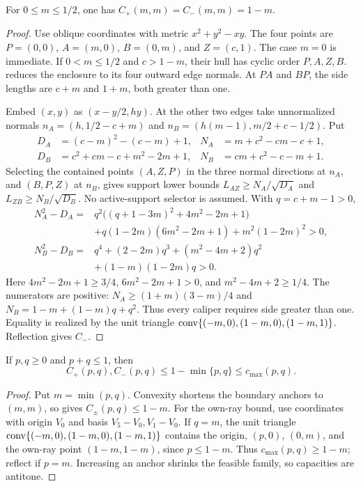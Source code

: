 \begin{lemma}
\label{lem:direct-neighbor-diagonal}
For $0\le m\le1/2$, one has $C_+(m,m)=C_-(m,m)=1-m$.
\end{lemma}
\begin{proof}
Use oblique coordinates with metric $x^2+y^2-xy$. The four points are
$P=(0,0)$, $A=(m,0)$, $B=(0,m)$, and $Z=(c,1)$. The case $m=0$
is immediate. If $0<m\le1/2$ and $c>1-m$, their hull has cyclic order
$P,A,Z,B$.  reduces the enclosure to its four outward
edge normals. At $PA$ and $BP$, the side lengths are $c+m$ and $1+m$,
both greater than one.

Embed $(x,y)$ as $(x-y/2,hy)$. At the other two edges take unnormalized
normals $n_A=(h,1/2-c+m)$ and $n_B=(h(m-1),m/2+c-1/2)$. Put
\[
\begin{aligned}
 D_A&=(c-m)^2-(c-m)+1,&N_A&=m+c^2-cm-c+1,\\
 D_B&=c^2+cm-c+m^2-2m+1,&N_B&=cm+c^2-c-m+1.
\end{aligned}
\]
Selecting the contained points $(A,Z,P)$ in the three normal directions
at $n_A$, and $(B,P,Z)$ at $n_B$, gives support lower bounds
$L_{AZ}\ge N_A/\sqrt{D_A}$ and $L_{ZB}\ge N_B/\sqrt{D_B}$.
No active-support selector is assumed. With $q=c+m-1>0$,
\[
\begin{aligned}
 N_A^2-D_A={}&q^2\big((q+1-3m)^2+4m^2-2m+1\big)\\
 &+q(1-2m)(6m^2-2m+1)+m^2(1-2m)^2>0,\\
 N_B^2-D_B={}&q^4+(2-2m)q^3+(m^2-4m+2)q^2\\
 &+(1-m)(1-2m)q>0.
\end{aligned}
\]
Here $4m^2-2m+1\ge3/4$, $6m^2-2m+1>0$, and
$m^2-4m+2\ge1/4$. The numerators are positive:
$N_A\ge(1+m)(3-m)/4$ and $N_B=1-m+(1-m)q+q^2$.
Thus every caliper requires side greater than one.
Equality is realized by the unit triangle
$\mathrm{conv}\{(-m,0),(1-m,0),(1-m,1)\}$. Reflection gives $C_-$.
\end{proof}

\begin{lemma}
\label{lem:new-common-pair-domination}
\label{lem:appendix-common-pair-domination}
If $p,q\ge0$ and $p+q\le1$, then
\[
 C_+(p,q),C_-(p,q)\le1-\min\{p,q\}\le c_{\max}(p,q).
\]
\end{lemma}
\begin{proof}
Put $m=\min(p,q)$. Convexity shortens the boundary anchors to $(m,m)$,
so  gives $C_\pm(p,q)\le1-m$.
For the own-ray bound, use coordinates with origin $V_0$ and basis
$V_5-V_0,V_1-V_0$. If $q=m$, the unit triangle
$\mathrm{conv}\{(-m,0),(1-m,0),(1-m,1)\}$ contains the origin, $(p,0)$,
$(0,m)$, and the own-ray point $(1-m,1-m)$, since $p\le1-m$.
Thus $c_{\max}(p,q)\ge1-m$; reflect if $p=m$.
Increasing an anchor shrinks the feasible family, so capacities are antitone.
\end{proof}

